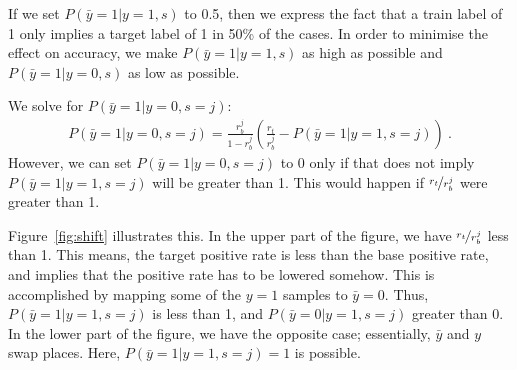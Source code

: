 If we set $P(\bar{y}=1|y=1,s)$ to 0.5,
then we express the fact that a train label of 1 only implies a target label of 1 in 50\% of the cases.
In order to minimise the effect on accuracy,
we make $P(\bar{y}=1|y=1,s)$ as high as possible and $P(\bar{y}=1|y=0,s)$ as low as possible.

We solve for $P(\bar{y}=1|y=0,s=j)$:
\begin{align}
  P(\bar{y}=1|y=0,s=j) = \frac{r_b^j}{1-r_b^j} \left(\frac{r_t}{r_b^j} - P(\bar{y}=1|y=1,s=j)\right)~.
\end{align}
However, we can set $P(\bar{y}=1|y=0,s=j)$ to 0
only if that does not imply $P(\bar{y}=1|y=1,s=j)$ will be greater than 1.
This would happen if $\nicefrac{r_t}{r_b^j}$ were greater than 1.

Figure~\ref{fig:shift} illustrates this.
In the upper part of the figure, we have $\nicefrac{r_t}{r_b^j}$ less than 1.
This means, the target positive rate is less than the base positive rate,
and implies that the positive rate has to be lowered somehow.
This is accomplished by mapping some of the $y=1$ samples to $\bar{y}=0$.
Thus, $P(\bar{y}=1|y=1,s=j)$ is less than 1, and $P(\bar{y}=0|y=1,s=j)$ greater than 0.
In the lower part of the figure, we have the opposite case; essentially, $\bar{y}$ and $y$ swap places.
Here, $P(\bar{y}=1|y=1,s=j)=1$ is possible.






% 
